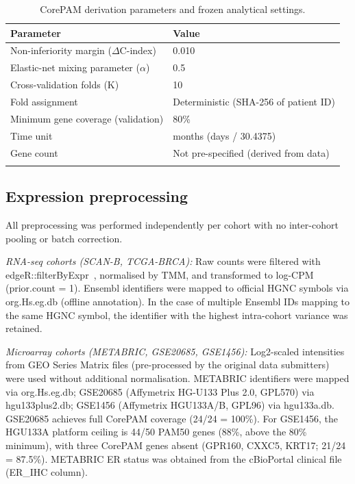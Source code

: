 \documentclass[referee,lineno,pdflatex,sn-vancouver-num]{sn-jnl}
\begin{document}
\begin{table}[h]
\caption{CorePAM derivation parameters and frozen analytical settings.}\label{tab:freeze}
\begin{tabular}{@{}ll@{}}
\toprule
Parameter & Value \\
\midrule
Non-inferiority margin ($\Delta$C-index) & 0.010 \\
Elastic-net mixing parameter ($\alpha$) & 0.5 \\
Cross-validation folds (K) & 10 \\
Fold assignment & Deterministic (SHA-256 of patient ID) \\
Minimum gene coverage (validation) & 80\% \\
Time unit & months (days / 30.4375) \\
Gene count & Not pre-specified (derived from data) \\
\botrule
\end{tabular}
\end{table}

\subsection{Expression preprocessing}\label{subsec:expression-preprocessing}

All preprocessing was performed independently per cohort with no inter-cohort pooling or batch correction.

\textit{RNA-seq cohorts (SCAN-B, TCGA-BRCA):} Raw counts were filtered with edgeR::filterByExpr~\cite{robinson2010}, normalised by TMM, and transformed to log-CPM (prior.count = 1). Ensembl identifiers were mapped to official HGNC symbols via org.Hs.eg.db (offline annotation). In the case of multiple Ensembl IDs mapping to the same HGNC symbol, the identifier with the highest intra-cohort variance was retained.

\textit{Microarray cohorts (METABRIC, GSE20685, GSE1456):} Log2-scaled intensities from GEO Series Matrix files (pre-processed by the original data submitters) were used without additional normalisation. METABRIC identifiers were mapped via org.Hs.eg.db; GSE20685 (Affymetrix HG-U133 Plus 2.0, GPL570) via hgu133plus2.db; GSE1456 (Affymetrix HGU133A/B, GPL96) via hgu133a.db. GSE20685 achieves full CorePAM coverage (24/24 = 100\%). For GSE1456, the HGU133A platform ceiling is 44/50 PAM50 genes (88\%, above the 80\% minimum), with three CorePAM genes absent (GPR160, CXXC5, KRT17; 21/24 = 87.5\%). METABRIC ER status was obtained from the cBioPortal clinical file (ER\_IHC column).
\end{document}

